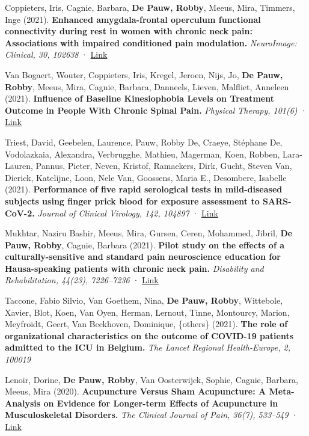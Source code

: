 \documentclass[
  letterpaper,
  DIV=11,
  numbers=noendperiod]{scrartcl}
\begin{document}
Coppieters, Iris, Cagnie, Barbara, \textbf{De Pauw, Robby}, Meeus, Mira,
Timmers, Inge (2021). \textbf{Enhanced amygdala-frontal operculum
functional connectivity during rest in women with chronic neck pain:
Associations with impaired conditioned pain modulation.}
\emph{NeuroImage: Clinical, 30, 102638} ·
\href{http://dx.doi.org/10.1016/J.NICL.2021.102638}{Link}

Van Bogaert, Wouter, Coppieters, Iris, Kregel, Jeroen, Nijs, Jo,
\textbf{De Pauw, Robby}, Meeus, Mira, Cagnie, Barbara, Danneels, Lieven,
Malfliet, Anneleen (2021). \textbf{Influence of Baseline Kinesiophobia
Levels on Treatment Outcome in People With Chronic Spinal Pain.}
\emph{Physical Therapy, 101(6)} ·
\href{http://dx.doi.org/10.1093/PTJ/PZAB076}{Link}

Triest, David, Geebelen, Laurence, Pauw, Robby De, Craeye, Stéphane De,
Vodolazkaia, Alexandra, Verbrugghe, Mathieu, Magerman, Koen, Robben,
Lara-Lauren, Pannus, Pieter, Neven, Kristof, Ramaekers, Dirk, Gucht,
Steven Van, Dierick, Katelijne, Loon, Nele Van, Goossens, Maria E.,
Desombere, Isabelle (2021). \textbf{Performance of five rapid
serological tests in mild-diseased subjects using finger prick blood for
exposure assessment to SARS-CoV-2.} \emph{Journal of Clinical Virology,
142, 104897} · \href{https://doi.org/10.1016\%2Fj.jcv.2021.104897}{Link}

Mukhtar, Naziru Bashir, Meeus, Mira, Gursen, Ceren, Mohammed, Jibril,
\textbf{De Pauw, Robby}, Cagnie, Barbara (2021). \textbf{Pilot study on
the effects of a culturally-sensitive and standard pain neuroscience
education for Hausa-speaking patients with chronic neck pain.}
\emph{Disability and Rehabilitation, 44(23), 7226--7236} ·
\href{http://dx.doi.org/10.1080/09638288.2021.1988155}{Link}

Taccone, Fabio Silvio, Van Goethem, Nina, \textbf{De Pauw, Robby},
Wittebole, Xavier, Blot, Koen, Van Oyen, Herman, Lernout, Tinne,
Montourcy, Marion, Meyfroidt, Geert, Van Beckhoven, Dominique,
\{others\} (2021). \textbf{The role of organizational characteristics on
the outcome of COVID-19 patients admitted to the ICU in Belgium.}
\emph{The Lancet Regional Health-Europe, 2, 100019}

Lenoir, Dorine, \textbf{De Pauw, Robby}, Van Oosterwijck, Sophie,
Cagnie, Barbara, Meeus, Mira (2020). \textbf{Acupuncture Versus Sham
Acupuncture: A Meta-Analysis on Evidence for Longer-term Effects of
Acupuncture in Musculoskeletal Disorders.} \emph{The Clinical Journal of
Pain, 36(7), 533--549} ·
\href{http://dx.doi.org/10.1097/AJP.0000000000000812}{Link}
\end{document}
